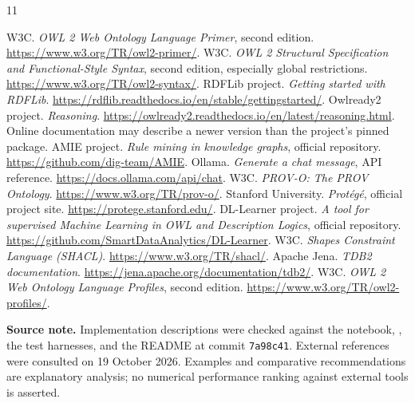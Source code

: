 \documentclass[11pt,a4paper]{article}
\newcommand{\code}[1]{\nolinkurl{#1}}
\newcommand{\file}[1]{\path{#1}}
\begin{document}
\begin{thebibliography}{11}
 W3C. \emph{OWL 2 Web Ontology Language Primer}, second edition.
\url{https://www.w3.org/TR/owl2-primer/}.
 W3C. \emph{OWL 2 Structural Specification and Functional-Style Syntax},
second edition, especially global restrictions.
\url{https://www.w3.org/TR/owl2-syntax/}.
 RDFLib project. \emph{Getting started with RDFLib}.
\url{https://rdflib.readthedocs.io/en/stable/gettingstarted/}.
 Owlready2 project. \emph{Reasoning}.
\url{https://owlready2.readthedocs.io/en/latest/reasoning.html}.
Online documentation may describe a newer version than the project's pinned package.
 AMIE project. \emph{Rule mining in knowledge graphs}, official repository.
\url{https://github.com/dig-team/AMIE}.
 Ollama. \emph{Generate a chat message}, API reference.
\url{https://docs.ollama.com/api/chat}.
 W3C. \emph{PROV-O: The PROV Ontology}.
\url{https://www.w3.org/TR/prov-o/}.
 Stanford University. \emph{Prot\'eg\'e}, official project site.
\url{https://protege.stanford.edu/}.
 DL-Learner project. \emph{A tool for supervised Machine Learning
in OWL and Description Logics}, official repository.
\url{https://github.com/SmartDataAnalytics/DL-Learner}.
 W3C. \emph{Shapes Constraint Language (SHACL)}.
\url{https://www.w3.org/TR/shacl/}.
 Apache Jena. \emph{TDB2 documentation}.
\url{https://jena.apache.org/documentation/tdb2/}.
 W3C. \emph{OWL 2 Web Ontology Language Profiles}, second edition.
\url{https://www.w3.org/TR/owl2-profiles/}.
\end{thebibliography}

\textbf{Source note.} Implementation descriptions were checked against the
notebook, \file{pipeline_support.py}, the test harnesses, and the README at
commit \code{7a98c41}. External references were consulted on 19 October 2026.
Examples and comparative recommendations are explanatory analysis; no numerical
performance ranking against external tools is asserted.
\end{document}
